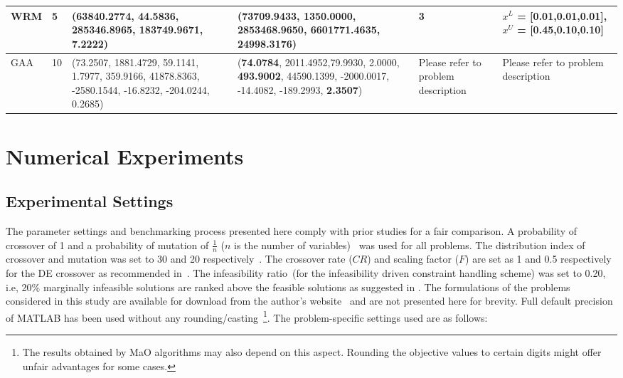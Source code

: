 \begin{table*}
\begin{tabular}{|l|l|p{3cm}|p{3cm}|p{3cm}|p{4cm}|}
		WRM										& 5          & (63840.2774, \textbf{44.5836}, 285346.8965, 183749.9671, 7.2222)                 & (\textbf{73709.9433}, 1350.0000, 2853468.9650, \textbf{6601771.4635}, \textbf{24998.3176})                                                & 3                                & $x^{L}$ = [0.01,0.01,0.01], $x^{U}$ = [0.45,0.10,0.10]  \\ \hline
		GAA                   & 10          & (73.2507, 1881.4729, 59.1141, 1.7977, 359.9166, 41878.8363, -2580.1544, -16.8232, -204.0244, 0.2685)                 & (\textbf{74.0784}, 2011.4952,79.9930, 2.0000, \textbf{493.9002}, 44590.1399, -2000.0017, -14.4082, -189.2993, \textbf{2.3507})                                                & Please refer to problem description                                & Please refer to problem description  \\ \hline
	\end{tabular}
\end{table*}


\section{Numerical Experiments}
\label{sec:numex}

\subsection{Experimental Settings}

The parameter settings and benchmarking process presented here comply with prior studies\cite{Deb2014adaptive,Wang2016adaptive} for a fair comparison. A probability of crossover of 1 and a probability of mutation of $\frac{1}{n}$ ($n$ is the number of variables)~\cite{Deb2014adaptive} was used for all problems. The distribution index of crossover and mutation was set to 30 and 20 respectively~\cite{Deb2014adaptive}. The crossover rate ($CR$) and scaling factor ($F$) are set as 1 and 0.5 respectively for the DE crossover as recommended in~\cite{das2011de}. The infeasibility ratio~(for the infeasibility driven constraint handling scheme) was set to 0.20, i.e, 20\% marginally infeasible solutions are ranked above the feasible solutions as suggested in \cite{Singh2013idea}.  The formulations of the problems considered in this study are available for download from the author's website~\cite{mdo2017adbea} and are not presented here for brevity. Full default precision of MATLAB has been used without any rounding/casting~\footnote{The results obtained by MaO algorithms may also depend on this aspect. Rounding the objective values to certain digits might offer unfair advantages for some cases.}. The problem-specific settings used are as follows:

